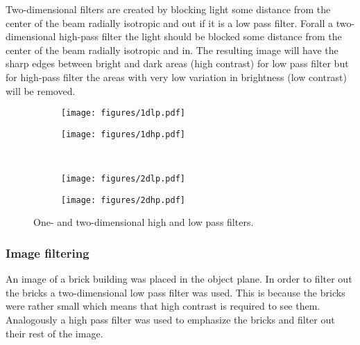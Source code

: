 \documentclass[12pt,a4paper]{article}
\begin{document}
Two-dimensional filters are created by blocking light some distance from the center of the beam radially isotropic and out if it is a low pass filter. Forall a two-dimensional high-pass filter the light should be blocked some distance from the center of the beam radially isotropic and in.
The resulting image will have the sharp edges between bright and dark areas (high contrast) for low pass filter but for high-pass filter the areas with very low variation in brightness (low contrast) will be removed.
\begin{figure}
  \centering
  \begin{subfigure}[b]{0.45\textwidth}
    \texttt{[image: figures/1dlp.pdf]}
  \end{subfigure}
  \begin{subfigure}[b]{0.45\textwidth}
    \texttt{[image: figures/1dhp.pdf]}
  \end{subfigure}\\
  \begin{subfigure}[b]{0.45\textwidth}
    \texttt{[image: figures/2dlp.pdf]}
  \end{subfigure}
  \begin{subfigure}[b]{0.45\textwidth}
    \texttt{[image: figures/2dhp.pdf]}
  \end{subfigure}
  \caption{One- and two-dimensional high and low pass filters.}
  \label{fig:filters}
\end{figure}

\subsubsection{Image filtering}
An image of a brick building was placed in the object plane. In order to filter out the bricks a two-dimensional low pass filter was used. This is because the bricks were rather small which means that high contrast is required to see them. Analogously a high pass filter was used to emphasize the bricks and filter out their rest of the image.
\end{document}
